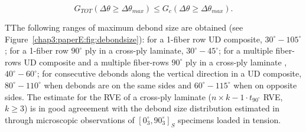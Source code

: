 \begin{equation}\label{paperE:eq:debmax}
G_{TOT}\left(\Delta\theta\geq\Delta\theta_{max}\right)\leq G_{c}\left(\Delta\theta\geq\Delta\theta_{max}\right).
\end{equation}

TThe following ranges of maximum debond size are obtained (see Figure~\ref{chap3:paperE:fig:debondsize}): for a 1-fiber row UD composite, $30^{\circ}-105^{\circ}$; for a 1-fiber row $90^{\circ}$ ply in a cross-ply laminate, $30^{\circ}-45^{\circ}$; for a multiple fiber-rows UD composite and a multiple fiber-rows $90^{\circ}$ ply in a cross-ply laminate , $40^{\circ}-60^{\circ}$; for consecutive debonds along the vertical direction in a UD composite, $80^{\circ}-110^{\circ}$ when debonds are on the same sides and $60^{\circ}-115^{\circ}$ when on opposite sides. The estimate for the RVE of a cross-ply laminate ($n\times k-1\cdot t_{90^{\circ}}$ RVE, $k\geq3$) is in good agreeement with the debond size distribution estimated in~\cite{Correa2018} through microscopic observations of $\left[0^{\circ}_{3},90^{\circ}_{3}\right]_{S}$ specimens loaded in tension.
